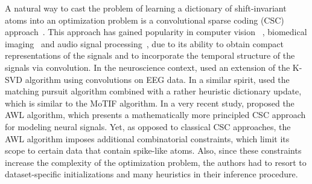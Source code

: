 A natural way to cast the problem of learning a dictionary of shift-invariant atoms into an optimization problem is a convolutional sparse coding (CSC) approach~\cite{Grosse-etal:2007}. 
This approach has gained popularity in computer vision~\cite{heide2015fast,wohlberg2016efficient,zeiler2010deconvolutional, vsorel2016fast,kavukcuoglu2010learning}%
, biomedical imaging~\cite{pachitariu2013extracting} and audio signal processing~\cite{Grosse-etal:2007,mailhe2008shift},
due to its ability to obtain compact representations of the signals and to incorporate the temporal structure of the signals via convolution.
In the neuroscience context, \citet{barthelemy2013multivariate} used an extension of the K-SVD algorithm using convolutions on EEG data. 
In a similar spirit, \citet{brockmeier2016learning} used the matching pursuit algorithm combined with a rather heuristic  
dictionary update, which is similar to the MoTIF algorithm. 
%
In a very recent study, \citet{hitziger2017adaptive} proposed the AWL algorithm, which presents a mathematically more principled CSC approach for modeling neural signals. Yet, as opposed to classical CSC approaches, the AWL algorithm imposes additional combinatorial  constraints, which limit its scope to certain data that contain spike-like atoms. Also, since these constraints increase the complexity of the optimization problem, the authors had to resort to dataset-specific initializations and many heuristics in their inference procedure.




